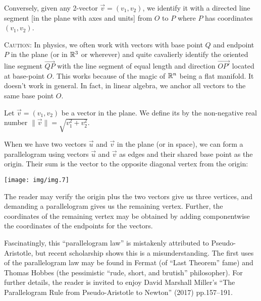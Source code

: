 Conversely, given any 2-vector $\vec{v}=(v_{1},v_{2})$, we identify it
with a directed line segment [in the plane with axes and units] from $O$
to $P$ where $P$ has coordinates $(v_{1},v_{2})$.

\begin{ddanger}\textsc{Caution:}
In physics, we often work with vectors with base point $Q$ and endpoint
$P$ in the plane (or in $\mathbb{R}^{3}$ or wherever) and quite cavalierly
identify the oriented line segment $\overrightarrow{QP}$ with the line
segment of equal length and direction $\overrightarrow{OP'}$ located at
base-point $O$. This works because of the magic of $\mathbb{R}^{n}$ being a
flat manifold. It doesn't work in general. In fact, in linear algebra,
we anchor all vectors to the same base point $O$.
\end{ddanger}

\begin{definition}
Let $\vec{v}=(v_{1},v_{2})$ be a vector in the plane. We define its
 by the non-negative real number
$\|\vec{v}\| = \sqrt{v_{1}^{2}+v_{2}^{2}}$.
\end{definition}

When we have two vectors $\vec{u}$ and $\vec{v}$ in the plane (or in space), we can form a
parallelogram using vectors $\vec{u}$ and $\vec{v}$ as edges and their
shared base point as the origin. Their sum
is the vector to the opposite diagonal vertex from the origin:
\begin{center}
  \texttt{[image: img/img.7]}
\end{center}
The reader may verify the origin plus the two vectors give us three
vertices, and demanding a parallelogram gives us the remaining
vertex. Further, the coordinates of the remaining vertex may be obtained
by adding componentwise the coordinates of the endpoints for the vectors.

\begin{remark}
Fascinatingly, this ``parallelogram law'' is mistakenly attributed to
Pseudo-Aristotle, but recent scholarship shows this is a
misunderstanding. The first uses of the parallelogram law may be found
in Fermat (of ``Last Theorem'' fame) and Thomas Hobbes (the pessimistic ``rude,
short, and brutish'' philosopher). For further details, the reader is
invited to enjoy David Marshall Miller's
``The Parallelogram Rule from Pseudo-Aristotle to Newton''
  (2017) pp.157--191.
\end{remark}

